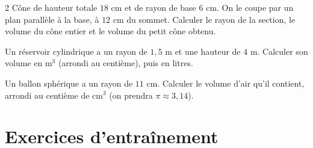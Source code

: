 \begin{multicols}{2}
\exo{} Cône de hauteur totale $18$ cm et de rayon de base $6$ cm. On le coupe par un
plan parallèle à la base, à $12$ cm du sommet. Calculer le rayon de la section, le volume du
cône entier et le volume du petit cône obtenu.

\exo{} Un réservoir cylindrique a un rayon de $1{,}5$ m et une hauteur de $4$ m.
Calculer son volume en m$^{3}$ (arrondi au centième), puis en litres.

\exo{} Un ballon sphérique a un rayon de $11$ cm. Calculer le volume d'air qu'il
contient, arrondi au centième de cm$^{3}$ (on prendra $\pi\approx3{,}14$).

\end{multicols}

\section{Exercices d'entraînement}
